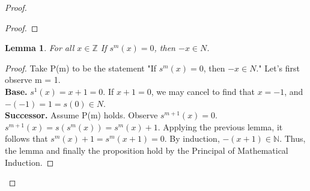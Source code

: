 \documentclass[12pt]{amsart}
\newcommand{\N}{\mathbb{N}}
\newcommand{\Z}{\mathbb{Z}}
\begin{document}
\begin{proof}
\begin{proof}
	\end{proof}
	\newtheorem*{lemma2}{Lemma}
	\begin{lemma2}
		For all $x \in \Z$ If $s^m(x) = 0$, then $-x \in N$.
	\end{lemma2}
	\begin{proof}
		Take P(m) to be the statement "If $s^m(x) = 0$, then $-x \in N$." Let's first observe m = 1.
		\\\textbf{Base.} $s^1(x) = x + 1 = 0$. If $x + 1 = 0$, we may cancel to find that $x = -1$, and $-(-1) = 1 = s(0) \in N$.
		\\\textbf{Successor.}  Assume P(m) holds. Observe $s^{m+1}(x) = 0$. $s^{m+1}(x) = s(s^m(x)) = s^m(x) + 1$. Applying the previous lemma, it follows that $ s^m(x) + 1 = s^m(x+1) = 0$. By induction, $-(x+1) \in \N$. Thus, the lemma and finally the proposition hold by the Principal of Mathematical Induction.
	\end{proof}

\end{proof}
\end{document}
